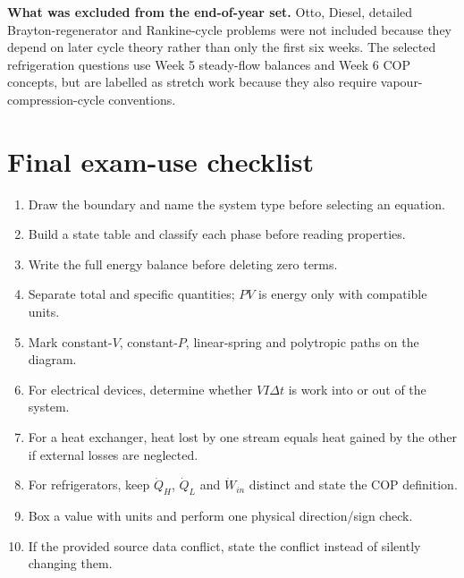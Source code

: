 \documentclass[10pt,a4paper]{article}
\begin{document}
\begin{center}\end{center}

\textbf{What was excluded from the end-of-year set.} Otto, Diesel, detailed Brayton-regenerator and Rankine-cycle problems were not included because they depend on later cycle theory rather than only the first six weeks. The selected refrigeration questions use Week 5 steady-flow balances and Week 6 COP concepts, but are labelled as stretch work because they also require vapour-compression-cycle conventions.

\clearpage{}
\clearpage{}
\clearpage{}
\clearpage{}
\clearpage{}
\clearpage{}

\clearpage
\section{Final exam-use checklist}
\begin{enumerate}
\item Draw the boundary and name the system type before selecting an equation.
\item Build a state table and classify each phase before reading properties.
\item Write the full energy balance before deleting zero terms.
\item Separate total and specific quantities; $PV$ is energy only with compatible units.
\item Mark constant-$V$, constant-$P$, linear-spring and polytropic paths on the diagram.
\item For electrical devices, determine whether $VI\Delta t$ is work into or out of the system.
\item For a heat exchanger, heat lost by one stream equals heat gained by the other if external losses are neglected.
\item For refrigerators, keep $\dot Q_H$, $\dot Q_L$ and $\dot W_{in}$ distinct and state the COP definition.
\item Box a value with units and perform one physical direction/sign check.
\item If the provided source data conflict, state the conflict instead of silently changing them.
\end{enumerate}
\end{document}
